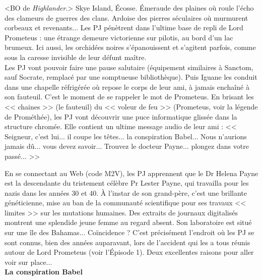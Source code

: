 \documentclass[11pt,twoside,a4paper]{book}
\begin{document}
<BO de \emph{Highlander}.> Skye Island, {\'E}cosse. {\'E}meraude des plaines o{\`u} roule l'{\'e}cho des clameurs de guerres des clans. Ardoise des pierres s{\'e}culaires o{\`u} murmurent corbeaux et revenants... Les PJ p{\'e}n{\`e}trent dans l'ultime base de repli de Lord Prometeus : une {\'e}trange demeure victorienne sur pilotis, au bord d'un lac brumeux. Ici aussi, les orchid{\'e}es noires s'{\'e}panouissent et s'agitent parfois, comme sous la caresse invisible de leur d{\'e}funt ma{\^i}tre.~\\

Les PJ vont pouvoir faire une pause salutaire ({\'e}quipement similaires {\`a} Sanctom, sauf Socrate, remplac{\'e} par une somptueuse biblioth{\`e}que). Puis Iguane les conduit dans une chapelle r{\'e}frig{\'e}r{\'e}e o{\`u} repose le corps de leur ami, {\`a} jamais encha{\^i}n{\'e} {\`a} son fauteuil. C'est le moment de se rappeler le mot de Prometeus. En brisant les << chaines >> (le fauteuil) du << voleur de feu >> (Prometeus, voir la l{\'e}gende de Prom{\'e}th{\'e}e), les PJ vont d{\'e}couvrir une puce informatique gliss{\'e}e dans la structure chrom{\'e}e. Elle contient un ultime message audio de leur ami : << Seigneur, c'est lui... il coupe les t{\^e}tes... la conspiration Babel... Nous n'aurions jamais d{\^u}... vous devez savoir... Trouvez le docteur Payne... plongez dans votre pass{\'e}... >>~\\

\clearpage

En se connectant au Web (code M2V), les PJ apprennent que le Dr Helena Payne est la descendante du tristement c{\'e}l{\`e}bre Pr Lester Payne, qui travailla pour les nazis dans les ann{\'e}es 30 et 40. {\`A} l'instar de son grand-p{\`e}re, c'est une brillante g{\'e}n{\'e}ticienne, mise au ban de la communaut{\'e} scientifique pour ses travaux << limites >> sur les mutations humaines. Des extraits de journaux digitalis{\'e}s montrent une splendide jeune femme au regard absent. Son laboratoire est situ{\'e} sur une {\^i}le des Bahamas... Co{\"i}ncidence ? C'est pr{\'e}cis{\'e}ment l'endroit o{\`u} les PJ se sont connus, bien des ann{\'e}es auparavant, lors de l'accident qui les a tous r{\'e}unis autour de Lord Prometeus (voir l'{\'E}pisode 1). Deux excellentes raisons pour aller voir sur place...~\\

\textbf{\large La conspiration Babel}~\\
\end{document}
